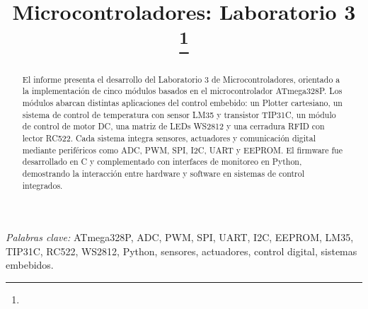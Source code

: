 \documentclass[conference]{IEEEtran}
\begin{document}
\title{Microcontroladores: Laboratorio 3\\
{\footnotesize \textsuperscript{}
}
\thanks{}
}

\author{
\and
{}
}
\maketitle


\begin{abstract}
El informe presenta el desarrollo del Laboratorio 3 de Microcontroladores, orientado a la implementación de cinco módulos basados en el microcontrolador ATmega328P. 
Los módulos abarcan distintas aplicaciones del control embebido: un Plotter cartesiano, un sistema de control de temperatura con sensor LM35 y transistor TIP31C, un módulo de control de motor DC, una matriz de LEDs WS2812 y una cerradura RFID con lector RC522. 
Cada sistema integra sensores, actuadores y comunicación digital mediante periféricos como ADC, PWM, SPI, I2C, UART y EEPROM. 
El firmware fue desarrollado en C y complementado con interfaces de monitoreo en Python, demostrando la interacción entre hardware y software en sistemas de control integrados.
\end{abstract}


\textit{Palabras clave:} ATmega328P, ADC, PWM, SPI, UART, I2C, EEPROM, LM35, TIP31C, RC522, WS2812, Python, sensores, actuadores, control digital, sistemas embebidos.












\nocite{*}


\appendix

\end{document}
